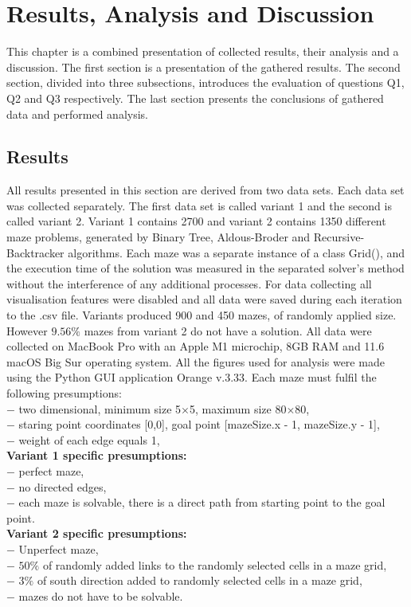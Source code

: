 \chapter{Results, Analysis and Discussion}\label{cha:Results Analysis and Discussion}
This chapter is a combined presentation of collected results, their analysis and a discussion. The first section is a presentation of the gathered results. 
The second section, divided into three subsections, introduces the evaluation of questions Q1, Q2 and Q3 respectively. The last section presents the 
conclusions of gathered data and performed analysis. 
\section{Results}
All results presented in this section are derived from two data sets. Each data set was collected separately. The first data set is called variant 1 and the second is 
called variant 2. Variant 1 contains 2700 and  variant 2 contains 1350 different maze problems, generated by Binary Tree, Aldous-Broder and Recursive-Backtracker
algorithms. Each maze was a separate instance of a class Grid(), and the execution time of the solution was measured in the separated solver's method without the interference of
any additional processes. For data collecting all visualisation features were disabled and all data were saved during each iteration to the .csv file.
Variants produced  900 and 450 mazes, of randomly applied size. However $9.56\%$ mazes from variant 2 do not have a solution. All data were collected on
MacBook Pro with an Apple M1 microchip, 8GB RAM and 11.6 macOS Big Sur operating system. All the figures used for analysis were made using the Python GUI application Orange v.3.33.
Each maze must fulfil the following presumptions:\\
$-$ two dimensional, minimum size 5$\times$5, maximum size 80$\times$80,\\
$-$ staring point coordinates [0,0], goal point [mazeSize.x - 1, mazeSize.y - 1],\\
$-$ weight of each edge equals 1,\\
\textbf{Variant 1 specific presumptions: }\\
$-$ perfect maze,\\
$-$ no directed edges,\\
$-$ each maze is solvable, there is a direct path from starting point to the goal point.\\
\textbf{Variant 2 specific presumptions: }\\
$-$ Unperfect maze,\\
$-$ $50\%$ of randomly added links to the randomly selected cells in a maze grid,\\
$-$ $3\%$ of south direction added to randomly selected cells in a maze grid,\\
$-$ mazes do not have to be solvable.\\

